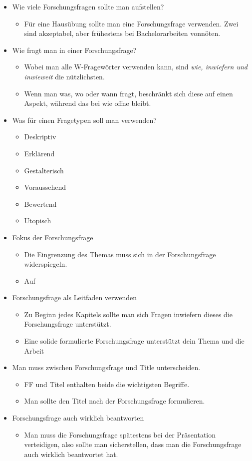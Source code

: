 \documentclass{article}
\begin{document}
	\begin{itemize}
		\item{Wie viele Forschungsfragen sollte man aufstellen?}
		\begin{itemize}
			\item{Für eine Hausübung sollte man eine Forschungsfrage verwenden. Zwei sind akzeptabel, aber frühestens bei Bachelorarbeiten vonnöten.}
		\end{itemize}
		\item{Wie fragt man in einer Forschungsfrage?}
		\begin{itemize}
			\item{Wobei man alle W-Fragewörter verwenden kann, sind \textit{wie, inwiefern und inwieweit} die nützlichsten.}
			\item{Wenn man was, wo oder wann fragt, beschränkt sich diese auf einen Aspekt, während das bei wie offne bleibt.}
		\end{itemize}
		\item{Was für einen Fragetypen soll man verwenden?}
		\begin{itemize}
			\item{Deskriptiv}
			\item{Erklärend}
			\item{Gestalterisch}
			\item{Voraussehend}
			\item{Bewertend}
			\item{Utopisch}
		\end{itemize}
		\item{Fokus der Forschungsfrage}
		\begin{itemize}
			\item{Die Eingrenzung des Themas muss sich in der Forschungsfrage widerspiegeln.}
			\item{Auf}
		\end{itemize}
		\item{Forschungsfrage als Leitfaden verwenden}
		\begin{itemize}
			\item{Zu Beginn jedes Kapitels sollte man sich Fragen inwiefern dieses die Forschungsfrage unterstützt.}
			\item{Eine solide formulierte Forschungsfrage unterstützt dein Thema und die Arbeit}
		\end{itemize}
		\item{Man muss zwischen Forschungsfrage und Title unterscheiden.}
		\begin{itemize}
			\item{FF und Titel enthalten beide die wichtigsten Begriffe.}
			\item{Man sollte den Titel nach der Forschungsfrage formulieren.}
		\end{itemize}
		\item{Forschungsfrage auch wirklich beantworten}
		\begin{itemize}
			\item{Man muss die Forschungsfrage spätestens bei der Präsentation verteidigen, also sollte man sicherstellen, dass man die Forschungsfrage auch wirklich beantwortet hat.}
		\end{itemize}
	\end{itemize}


	

	
\end{document}
